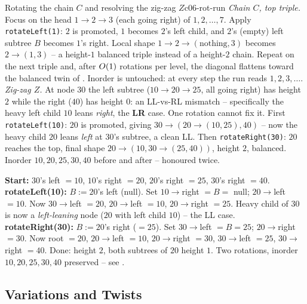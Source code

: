 \begin{example}{Rotating the chain $C$ and resolving the zig-zag $Z$}{c06-rot-run}
\emph{Chain $C$, top triple.} Focus on the head $1\to 2\to 3$ (each going right) of $1,2,\dots,7$.
Apply \texttt{rotateLeft(1)}: $2$ is promoted, $1$ becomes $2$'s left child, and $2$'s (empty) left
subtree $B$ becomes $1$'s right. Local shape $1\to 2\to(\text{nothing},3)$ becomes $2\to(1,3)$ -- a
height-$1$ balanced triple instead of a height-$2$ chain. Repeat on the next triple and, after
$O(1)$ rotations per level, the diagonal flattens toward the balanced twin of
. Inorder is untouched: at every step the run reads $1,2,3,\dots$.\\
\emph{Zig-zag $Z$.} At node $30$ the left subtree ($10\to 20\to 25$, all going right) has height $2$
while the right ($40$) has height $0$: an LL-vs-RL mismatch -- specifically the heavy left child $10$
leans \emph{right}, the \textbf{LR} case. One rotation cannot fix it. First \texttt{rotateLeft(10)}:
$20$ is promoted, giving $30\to(20\to(10,25),40)$ -- now the heavy child $20$ leans \emph{left} at
$30$'s subtree, a clean LL. Then \texttt{rotateRight(30)}: $20$ reaches the top, final shape
$20\to(10, 30\to(25,40))$, height $2$, balanced. Inorder $10,20,25,30,40$ before and after --
 honoured twice.
\end{example}
\begin{tracebox}
\textbf{Start:} $30$'s left $=10$, $10$'s right $=20$, $20$'s right $=25$, $30$'s right $=40$.
\textbf{rotateLeft(10):} $B := 20$'s left (null). Set $10\to$right $=B=$ null; $20\to$left $=10$.
Now $30\to$left $=20$, $20\to$left $=10$, $20\to$right $=25$. Heavy child of $30$ is now a
\emph{left-leaning} node ($20$ with left child $10$) -- the LL case.
\textbf{rotateRight(30):} $B := 20$'s right ($=25$). Set $30\to$left $=B=25$; $20\to$right $=30$.
Now root $=20$, $20\to$left $=10$, $20\to$right $=30$, $30\to$left $=25$, $30\to$right $=40$. Done:
height $2$, both subtrees of $20$ height $1$. \checkmark Two rotations, inorder $10,20,25,30,40$
preserved -- see .
\end{tracebox}

\subsection{Variations and Twists}

